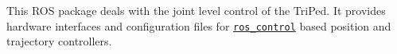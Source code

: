 This R\+OS package deals with the joint level control of the Tri\+Ped. It provides hardware interfaces and configuration files for \href{http://wiki.ros.org/ros_control}{\tt ros\+\_\+control} based position and trajectory controllers. 